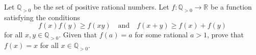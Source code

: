 Let $\mathbb{Q}_{>0}$ be the set of positive rational numbers. Let $f:\mathbb{Q}_{>0}\to\mathbb{R}$ be a function satisfying the conditions \[f\left(x\right)f\left(y\right)\geq f\left(xy\right)\quad\text{and}\quad f\left(x+y\right)\geq f\left(x\right)+f\left(y\right)\] for all $x,y\in\mathbb{Q}_{>0}$. Given that $f\left(a\right)=a$ for some rational $a>1$, prove that $f\left(x\right)=x$ for all $x\in\mathbb{Q}_{>0}$.
